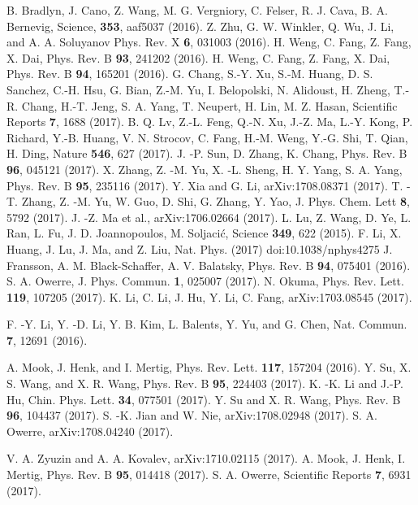 \documentclass[doublecol]{epl2}
\begin{document}
\begin{thebibliography}{0}
B. Bradlyn, J. Cano, Z. Wang, M. G. Vergniory, C. Felser, R. J. Cava, B. A. Bernevig, Science, {\bf 353}, aaf5037 (2016). 
Z. Zhu, G. W. Winkler, Q. Wu, J. Li, and A. A. Soluyanov
Phys. Rev. X {\bf 6}, 031003 (2016).
H. Weng, C. Fang, Z. Fang, X. Dai, Phys. Rev. B {\bf 93}, 241202 (2016).
H. Weng, C. Fang, Z. Fang, X. Dai,  Phys. Rev. B {\bf 94}, 165201 (2016).
G. Chang, S.-Y. Xu, S.-M. Huang, D. S. Sanchez, C.-H. Hsu, G. Bian, Z.-M. Yu, I. Belopolski, N. Alidoust, H. Zheng, T.-R. Chang, H.-T. Jeng, S. A. Yang, T. Neupert, H. Lin, M. Z. Hasan, Scientific Reports {\bf 7}, 1688 (2017).
B. Q. Lv, Z.-L. Feng, Q.-N. Xu, J.-Z. Ma, L.-Y. Kong, P. Richard, Y.-B. Huang, V. N. Strocov, C. Fang, H.-M. Weng, Y.-G. Shi, T. Qian, H. Ding,  Nature {\bf 546}, 627 (2017).
J. -P. Sun, D. Zhang, K. Chang, Phys. Rev. B {\bf 96}, 045121 (2017).
X. Zhang, Z. -M. Yu, X. -L. Sheng, H. Y. Yang, S. A. Yang, Phys. Rev. B {\bf 95}, 235116 (2017).
Y. Xia and G. Li, arXiv:1708.08371 (2017).
T. -T. Zhang, Z. -M. Yu, W. Guo, D. Shi, G. Zhang, Y. Yao, J. Phys. Chem. Lett  {\bf 8},  5792 (2017).
J. -Z. Ma et al., arXiv:1706.02664 (2017).
L. Lu, Z. Wang, D. Ye, L. Ran, L. Fu, J. D. Joannopoulos, M. Soljaci\'c,  Science {\bf 349}, 622 (2015).
F. Li,	X. Huang,	J. Lu,	J. Ma, and Z. Liu, Nat. Phys. (2017) doi:10.1038/nphys4275
J. Fransson, A. M. Black-Schaffer, A. V. Balatsky, Phys. Rev. B {\bf 94}, 075401 (2016).
S. A. Owerre, J. Phys. Commun. {\bf 1}, 025007 (2017).
 N. Okuma, Phys. Rev. Lett. {\bf 119}, 107205 (2017).
 K. Li, C. Li, J. Hu, Y. Li, C. Fang, 	arXiv:1703.08545 (2017).
 
 F. -Y. Li, Y. -D. Li, Y. B. Kim, L. Balents, Y. Yu, and G. Chen, Nat. Commun.  {\bf 7}, 12691 (2016).
 
  A. Mook, J. Henk, and I. Mertig, Phys. Rev. Lett.  {\bf 117}, 157204 (2016).
 Y. Su, X. S. Wang, and X. R. Wang, Phys. Rev. B {\bf 95}, 224403 (2017).
 K. -K. Li and J.-P. Hu, Chin. Phys. Lett. {\bf 34}, 077501 (2017).
  Y. Su and X. R. Wang, Phys. Rev. B {\bf 96}, 104437 (2017).
  S. -K. Jian and  W. Nie, arXiv:1708.02948 (2017).
  S. A. Owerre, arXiv:1708.04240 (2017).
  
  
  V. A. Zyuzin and A. A. Kovalev, arXiv:1710.02115 (2017).
   A. Mook, J. Henk, I. Mertig, Phys. Rev. B {\bf 95}, 014418 (2017).
   S. A. Owerre, Scientific Reports {\bf 7}, 6931 (2017).
   

\end{thebibliography}
\end{document}

